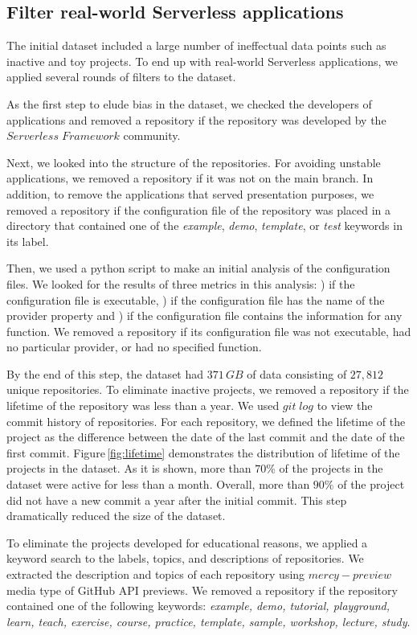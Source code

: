 \subsection{Filter real-world Serverless applications} \label{phaseB}
The initial dataset included a large number of ineffectual data points 
such as inactive and toy projects. To end up with real-world Serverless 
applications, we applied several rounds of filters to the dataset.

As the first step to elude bias in the dataset, we checked the developers 
of applications and removed a repository if the repository was developed 
by the $Serverless \; Framework$ community. 

Next, we looked into the structure of the repositories. 
For avoiding unstable applications, we removed a repository if it was not 
on the main branch. In addition, to remove the applications that served 
presentation purposes, we removed a repository if the configuration file 
of the repository was placed in a directory that contained one of the 
\emph{example}, \emph{demo}, \emph{template}, or \emph{test} 
keywords in its label.

Then, we used a python script to make an initial analysis of the 
configuration files. We looked for the results of three metrics in this 
analysis: ) if the configuration file is executable, ) if 
the configuration file has the name of the provider property and 
) if the configuration file contains the information for any 
function. We removed a repository if its configuration file was not 
executable, had no particular provider, or had no specified function.

By the end of this step, the dataset had $371 \, GB$ of data consisting 
of $27,812$ unique repositories. To eliminate inactive projects, we 
removed a repository if the lifetime of the repository was less than 
a year. We used $git \; log$ to view the commit history of repositories. 
For each repository, we defined the lifetime of the project as the difference 
between the date of the last commit and the date of the first commit. 
Figure\,\ref{fig:lifetime} demonstrates the distribution of lifetime of the 
projects in the dataset. As it is shown, more than $70\%$ of the projects 
in the dataset were active for less than a month. Overall, more than $90\%$ 
of the project did not have a new commit a year after the initial commit. 
This step dramatically reduced the size of the dataset.

To eliminate the projects developed for educational reasons, 
we applied a keyword search to the labels, topics, and 
descriptions of repositories. We extracted the description 
and topics of each repository using $mercy-preview$ media 
type of GitHub API previews. We removed a repository 
if the repository contained one of the following keywords: 
\emph{example, demo, tutorial, playground, learn, teach, exercise, 
	course, practice, template, sample, workshop, lecture, study}.

